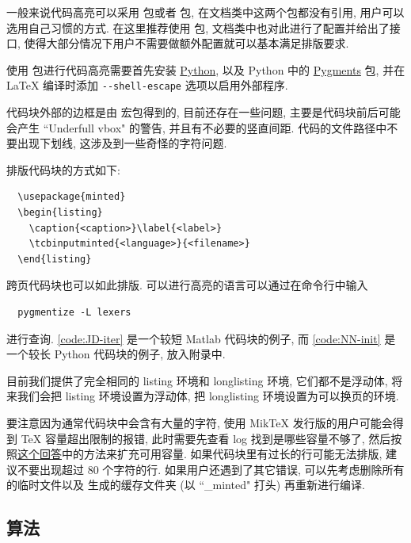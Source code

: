一般来说代码高亮可以采用  包或者  包, 在文档类中这两个包都没有引用, 用户可以选用自己习惯的方式. 在这里推荐使用  包, 文档类中也对此进行了配置并给出了接口, 使得大部分情况下用户不需要做额外配置就可以基本满足排版要求.

使用  包进行代码高亮需要首先安装 \href{https://wiki.python.org/moin/BeginnersGuide/Download}{Python}, 以及 Python 中的 \href{https://pygments.org/download/}{Pygments} 包, 并在 {\LaTeX} 编译时添加 \verb|--shell-escape| 选项以启用外部程序.

代码块外部的边框是由  宏包得到的, 目前还存在一些问题, 主要是代码块前后可能会产生 ``Underfull vbox" 的警告, 并且有不必要的竖直间距. 代码的文件路径中不要出现下划线, 这涉及到一些奇怪的字符问题.

排版代码块的方式如下:
\begin{verbatim}
  \usepackage{minted}
  \begin{listing}
    \caption{<caption>}\label{<label>}
    \tcbinputminted{<language>}{<filename>}
  \end{listing}
\end{verbatim}
跨页代码块也可以如此排版. 可以进行高亮的语言可以通过在命令行中输入
\begin{verbatim}
  pygmentize -L lexers
\end{verbatim}
进行查询. \ref{code:JD-iter} 是一个较短 Matlab 代码块的例子, 而 \ref{code:NN-init} 是一个较长 Python 代码块的例子, 放入附录中.

目前我们提供了完全相同的 listing 环境和 longlisting 环境, 它们都不是浮动体, 将来我们会把 listing 环境设置为浮动体, 把 longlisting 环境设置为可以换页的环境.

要注意因为通常代码块中会含有大量的字符, 使用 MikTeX 发行版的用户可能会得到 TeX 容量超出限制的报错, 此时需要先查看 log 找到是哪些容量不够了, 然后按照\href{https://tex.stackexchange.com/a/548335/}{这个回答}中的方法来扩充可用容量. 如果代码块里有过长的行可能无法排版, 建议不要出现超过 80 个字符的行. 如果用户还遇到了其它错误, 可以先考虑删除所有的临时文件以及  生成的缓存文件夹 (以 ``\_minted" 打头) 再重新进行编译.


\subsection{算法}

